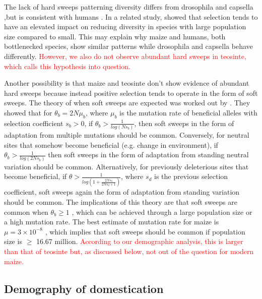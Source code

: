 \documentclass{pnastwo}
\begin{document}
\begin{article}
The lack of hard sweeps patterning diversity differs from drosophila \cite{sattath2011} and capsella \cite{williamson2014},but is consistent with humans \cite{hernandez2011}. In a related study, \cite{corbett2015} showed that selection tends to have an elevated impact on reducing diversity in species with large population size compared to small. This may explain why maize and humans, both bottlenecked species, show similar patterns while drosophila and capsella behave differently. \textcolor{red}{However, we also do not observe abundant hard sweeps in teosinte, which calls this hypothesis into question.}

Another possibility is that maize and teosinte don't show evidence of abundant hard sweeps because instead positive selection tends to operate in the form of soft sweeps. The theory of when soft sweeps are expected was worked out by \cite{messer2013population}. They showed that for $\theta_b = 2N\mu_b$, where $\mu_b$ is the mutation rate of beneficial alleles with selection coefficient $s_b > 0$, if $\theta_b > \frac{1}{log({Ns_b})}$, then soft sweeps in the form of adaptation from multiple mutations should be common. Conversely, for neutral sites that somehow become beneficial (e.g. change in environment), if $\theta_b > \frac{1}{log({2Ns_b})}$ then soft sweeps in the form of adaptation from standing neutral variation should be common. Alternatively, for previously deleterious sites that become beneficial, if $\theta > \frac{1}{log \left(1+\frac{2Ns_b}{2Ns_d + 1} \right)}$, where $s_d$ is the previous selection coefficient, soft sweeps again the form of adaptation from standing variation should be common. The implications of this theory are that soft sweeps are common when $\theta_b \geq 1$ \cite{messer2013population}, which can be achieved through a large population size or a high mutation rate. The best estimate of mutation rate for maize is $\mu = 3 \times 10^{-8}$  \cite{clark2005}, which implies that soft sweeps should be common if population size is $\geq$ 16.67 million. \textcolor{red}{According to our demographic analysis, this is larger than that of teosinte but, as discussed below, not out of the question for modern maize.}
\subsection{Demography of domestication}


\end{article}
\end{document}
